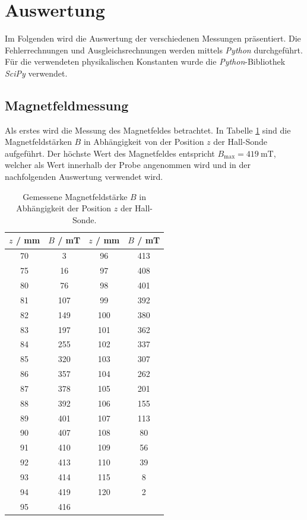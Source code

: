 \section{Auswertung}
\label{sec:Auswertung}

\raggedright

Im Folgenden wird die Auswertung der verschiedenen Messungen präsentiert. Die Fehlerrechnungen und Ausgleichsrechnungen werden mittels \textit{Python} durchgeführt.
Für die verwendeten physikalischen Konstanten wurde die \textit{Python}-Bibliothek \textit{SciPy} \cite{scipy} verwendet.

\subsection{Magnetfeldmessung}

Als erstes wird die Messung des Magnetfeldes betrachtet. In Tabelle \ref{tab:magnetfeld} sind die Magnetfeldstärken $B$ in Abhängigkeit von der Position $z$ der Hall-Sonde aufgeführt.
Der höchste Wert des Magnetfeldes entspricht $B_{\mathrm{max}}=\SI{419}{\milli\tesla}$, welcher als Wert innerhalb der Probe angenommen wird und in der nachfolgenden Auswertung verwendet wird.

\begin{table}
  \centering
  \begin{tabular}{c c c c}
    \toprule
    $z$ / mm & $B$ / mT & $z$ / mm & $B$ / mT\\
    \midrule
        70  &  3   &  96   & 413  \\
        75  &  16  &  97   & 408  \\
        80  &  76  &  98   & 401  \\
        81  &  107 &  99   & 392  \\
        82  &  149 &  100  & 380  \\
        83  &  197 &  101  & 362  \\
        84  &  255 &  102  & 337  \\
        85  &  320 &  103  & 307  \\
        86  &  357 &  104  & 262  \\
        87  &  378 &  105  & 201  \\
        88  &  392 &  106  & 155  \\
        89  &  401 &  107  & 113  \\
        90  &  407 &  108  & 80   \\
        91  &  410 &  109  & 56   \\
        92  &  413 &  110  & 39   \\
        93  &  414 &  115  & 8    \\
        94  &  419 &  120  & 2    \\
        95  &  416 &       &      \\
    \bottomrule
  \end{tabular}
  \caption{Gemessene Magnetfeldstärke $B$ in Abhängigkeit der Position $z$ der Hall-Sonde.}
  \label{tab:magnetfeld}
\end{table}

